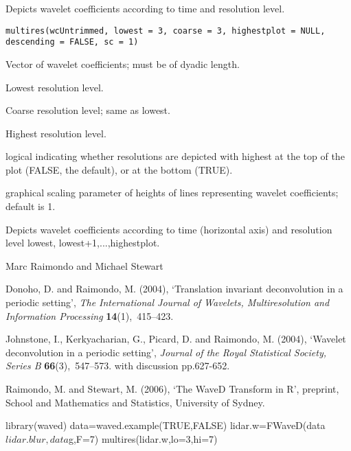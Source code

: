 \documentclass{article}
\begin{document}
\begin{Description}\relax
Depicts wavelet coefficients according to time and resolution level.
\end{Description}
\begin{Usage}
\begin{verbatim}
multires(wcUntrimmed, lowest = 3, coarse = 3, highestplot = NULL, descending = FALSE, sc = 1)
\end{verbatim}
\end{Usage}
\begin{Arguments}
\begin{ldescription}
\item[\code{wcUntrimmed}] Vector of wavelet coefficients; must be of dyadic length.
\item[\code{lowest}] Lowest resolution level.
\item[\code{coarse}] Coarse resolution level; same as lowest.
\item[\code{highestplot}] Highest resolution level.
\item[\code{descending}] logical indicating whether resolutions are depicted with highest at the top of the plot (FALSE, the default), or at the bottom (TRUE).
\item[\code{sc}] graphical scaling parameter of heights of lines representing wavelet coefficients; default is 1.
\end{ldescription}
\end{Arguments}
\begin{Value}
Depicts wavelet coefficients according to time (horizontal axis)
and resolution level lowest, lowest+1,...,highestplot.
\end{Value}
\begin{Author}\relax
Marc Raimondo and Michael Stewart
\end{Author}
\begin{References}\relax
Donoho, D. and Raimondo, M.  (2004),
`Translation invariant deconvolution in a periodic setting', {\em The
International Journal of Wavelets, Multiresolution and Information
Processing} {\bf 14}(1),~415--423.

Johnstone, I., Kerkyacharian, G., Picard, D. and Raimondo, M.  (2004), 
`Wavelet deconvolution in a periodic
setting', {\em Journal of the Royal Statistical Society, Series B} {\bf
66}(3),~547--573.  with discussion pp.627-652.

Raimondo, M. and Stewart, M. (2006),
`The WaveD Transform in R', preprint, School and Mathematics and Statistics,
University of Sydney.
\end{References}
\begin{SeeAlso}\relax
{}
\end{SeeAlso}
\begin{Examples}
\begin{ExampleCode}
library(waved)
data=waved.example(TRUE,FALSE)
lidar.w=FWaveD(data$lidar.blur,data$g,F=7)
multires(lidar.w,lo=3,hi=7)
\end{ExampleCode}
\end{Examples}
\end{document}
